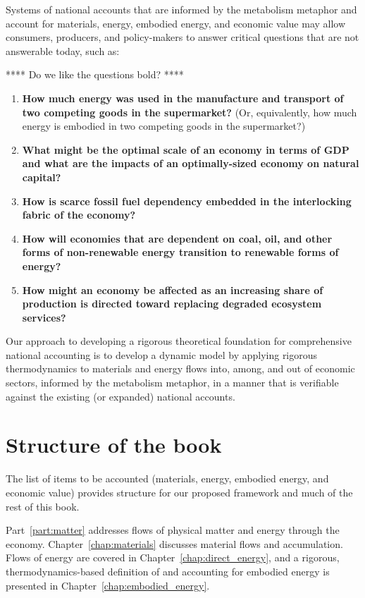 Systems of national accounts that are informed by the metabolism metaphor 
and account for materials, energy, embodied energy, and economic value
may allow consumers, producers,
and policy-makers to answer critical questions that are not
answerable today, such as:

**** Do we like the questions bold? ****

\begin{enumerate}
	\item{\textbf{How much energy was used in the manufacture and transport
				of two competing goods in the supermarket?} 
				(Or, equivalently, how much energy is embodied 
				in two competing goods in the supermarket?)}
	\item{\textbf{What might be the optimal scale of an economy in terms of GDP 
				and what are the impacts of an optimally-sized economy on natural capital?}}
    \item{\textbf{How is scarce fossil fuel dependency embedded 
    			in the interlocking fabric of the economy?}} 
    \item{\textbf{How will economies that are dependent on coal, oil, 
     			and other forms of non-renewable energy transition 
    			to renewable forms of energy?}}
	\item{\textbf{How might an economy be affected as an increasing share of production
				is directed toward replacing 
				degraded ecosystem services?}~\cite[p.~221]{kummel2011}​}
\end{enumerate}

Our approach to developing a rigorous theoretical foundation for 
comprehensive national accounting is to
develop a dynamic model 
by applying rigorous thermodynamics 
to materials and energy flows into, among, 
and out of economic sectors,
informed by the metabolism metaphor,
in a manner that is verifiable against 
the existing (or expanded) 
national accounts.


\section{Structure of the book}
\label{sec:structure}

The list of items to be accounted 
(materials, energy, embodied energy, and economic value)
provides structure for our proposed framework
and much of the rest of this book.

Part~\ref{part:matter} addresses flows of physical matter and energy
through the economy.
Chapter~\ref{chap:materials} discusses material flows and accumulation.
Flows of energy are covered in Chapter~\ref{chap:direct_energy}, 
and a rigorous, thermodynamics-based definition of and accounting for 
embodied energy is presented in Chapter~\ref{chap:embodied_energy}.

